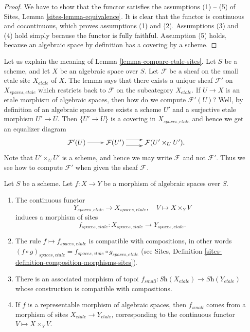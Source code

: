 \begin{proof}
We have to show that the functor satisfies the assumptions (1) -- (5) of
Sites, Lemma \ref{sites-lemma-equivalence}.
It is clear that the functor is continuous and cocontinuous, which
proves assumptions (1) and (2).
Assumptions (3) and (4) hold simply because the functor is fully faithful.
Assumption (5) holds, because an algebraic space by definition has
a covering by a scheme.
\end{proof}

\begin{remark}
\label{remark-explain-equivalence}
Let us explain the meaning of Lemma \ref{lemma-compare-etale-sites}.
Let $S$ be a scheme, and let $X$ be an algebraic space over $S$.
Let $\mathcal{F}$ be a sheaf on the small etale site $X_{etale}$ of $X$.
The lemma says that there exists a unique sheaf $\mathcal{F}'$ on
$X_{spaces, etale}$ which restricts back to $\mathcal{F}$ on the
subcategory $X_{etale}$. If $U \to X$ is an etale morphism of algebraic
spaces, then how do we compute $\mathcal{F}'(U)$? Well, by definition
of an algebraic space there exists a scheme $U'$ and a surjective
etale morphism $U' \to U$. Then $\{U' \to U\}$ is a covering in
$X_{spaces, etale}$ and hence we get an equalizer diagram
$$
\xymatrix{
\mathcal{F}'(U) \ar[r] &
\mathcal{F}(U') \ar@<1ex>[r] \ar@<-1ex>[r] &
\mathcal{F}(U' \times_U U').
}
$$
Note that $U' \times_U U'$ is a scheme, and hence we may
write $\mathcal{F}$ and not $\mathcal{F}'$.
Thus we see how to compute $\mathcal{F}'$
when given the sheaf $\mathcal{F}$.
\end{remark}

\begin{lemma}
\label{lemma-functoriality-etale-site}
Let $S$ be a scheme.
Let $f : X \to Y$ be a morphism of algebraic spaces over $S$.
\begin{enumerate}
\item The continuous functor
$$
Y_{spaces, etale} \longrightarrow X_{spaces, etale}, \quad
V \longmapsto X \times_Y V
$$
induces a morphism of sites
$$
f_{spaces, etale} : X_{spaces, etale} \to Y_{spaces, etale}.
$$
\item The rule $f \mapsto f_{spaces, etale}$ is compatible with
compositions, in other words $(f \circ g)_{spaces, etale}
= f_{spaces, etale} \circ g_{spaces, etale}$ (see
Sites, Definition \ref{sites-definition-composition-morphisms-sites}).
\item There is an associated morphism of topoi
$f_{small} : \textit{Sh}(X_{etale}) \to \textit{Sh}(Y_{etale})$
whose construction is compatible with compositions.
\item If $f$ is a representable morphism of algebraic spaces,
then $f_{small}$ comes from a morphism of sites $X_{etale} \to Y_{etale}$,
corresponding to the continuous functor $V \mapsto X \times_Y V$.
\end{enumerate}
\end{lemma}

